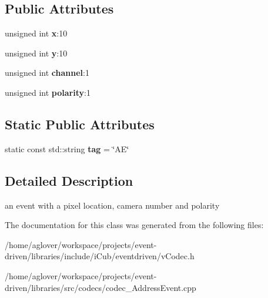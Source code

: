 \subsection*{Public Attributes}
\begin{DoxyCompactItemize}
\item 
unsigned int {\bfseries x}\+:10\hypertarget{classev_1_1AddressEvent_ab6015dc7a789cb6ff7546c47d58829bf}{}\label{classev_1_1AddressEvent_ab6015dc7a789cb6ff7546c47d58829bf}

\item 
unsigned int {\bfseries y}\+:10\hypertarget{classev_1_1AddressEvent_a2e6918d9a0c935c2424e8096ed610c6f}{}\label{classev_1_1AddressEvent_a2e6918d9a0c935c2424e8096ed610c6f}

\item 
unsigned int {\bfseries channel}\+:1\hypertarget{classev_1_1AddressEvent_ab96b9ac3a42cf1d69859f1edbea9cc7f}{}\label{classev_1_1AddressEvent_ab96b9ac3a42cf1d69859f1edbea9cc7f}

\item 
unsigned int {\bfseries polarity}\+:1\hypertarget{classev_1_1AddressEvent_a79bbcea834183012aa39e9d4b2c594ed}{}\label{classev_1_1AddressEvent_a79bbcea834183012aa39e9d4b2c594ed}

\end{DoxyCompactItemize}
\subsection*{Static Public Attributes}
\begin{DoxyCompactItemize}
\item 
static const std\+::string {\bfseries tag} = \char`\"{}AE\char`\"{}\hypertarget{classev_1_1AddressEvent_a9a2d3e863964a1247ae4203a4ad2c646}{}\label{classev_1_1AddressEvent_a9a2d3e863964a1247ae4203a4ad2c646}

\end{DoxyCompactItemize}


\subsection{Detailed Description}
an event with a pixel location, camera number and polarity 

The documentation for this class was generated from the following files\+:\begin{DoxyCompactItemize}
\item 
/home/aglover/workspace/projects/event-\/driven/libraries/include/i\+Cub/eventdriven/v\+Codec.\+h\item 
/home/aglover/workspace/projects/event-\/driven/libraries/src/codecs/codec\+\_\+\+Address\+Event.\+cpp\end{DoxyCompactItemize}
